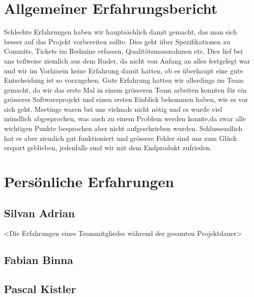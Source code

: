 \documentclass[11pt]{scrartcl}
\begin{document}
\section{Allgemeiner Erfahrungsbericht}
Schlechte Erfahrungen haben wir hauptsächlich damit gemacht, 
das man sich besser auf das Projekt vorbereiten sollte.
Dies geht über Spezifikationen zu Commits, 
Tickets im Redmine erfassen, Qualitätsmassnahmen etc.
Dies lief bei uns teilweise ziemlich aus dem Ruder, 
da nicht von Anfang an alles
 festgelegt war und wir im Vorhinein keine Erfahrung damit hatten, ob es 
 überhaupt eine gute Entscheidung ist so vorzugehen.
 Gute Erfahrung hatten wir allerdings im Team gemacht, da wir das erste Mal
 in einem grösseren Team arbeiten konnten für ein grösseres Softwareprojekt
 und einen ersten Einblick bekommen haben, wie es vor sich geht.
 Meetings waren bei uns vielmals nicht nötig und es wurde viel
 mündlich abgesprochen, was auch zu einem Problem werden konnte,da
 zwar alle wichtigen Punkte besprochen aber nicht aufgeschrieben wurden.
 Schlussendlich hat es aber ziemlich gut funktioniert und grössere Fehler
 sind uns zum Glück erspart geblieben, jedenfalls sind wir mit dem Endprodukt
  zufrieden.
\section{Persönliche Erfahrungen}

\subsection{Silvan Adrian}
<Die Erfahrungen eines Teammitgliedes während der gesamten Projektdauer>
\subsection{Fabian Binna}

\subsection{Pascal Kistler}
\end{document}
